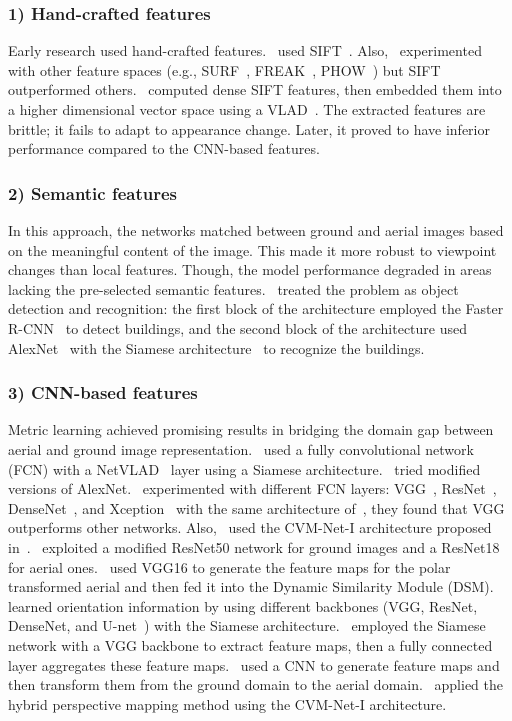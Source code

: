 \documentclass[10pt,letterpaper]{article}
\begin{document}
\subsubsection*{1) Hand-crafted features}
Early research used hand-crafted features.~\cite{bib20,bib26} used SIFT~\cite{bib27}. Also,~\cite{bib20} experimented with other feature spaces (e.g., SURF~\cite{bib28}, FREAK~\cite{bib29}, PHOW~\cite{bib30}) but SIFT outperformed others.~\cite{bib7} computed dense SIFT features, then embedded them into a higher dimensional vector space using a VLAD~\cite{bib31}. The extracted features are brittle; it fails to adapt to appearance change. Later, it proved to have inferior performance compared to the CNN-based features.
\subsubsection*{2) Semantic features}
In this approach, the networks matched between ground and aerial images based on the meaningful content of the image. This made it more robust to viewpoint changes than local features. Though, the model performance degraded in areas lacking the pre-selected semantic features.~\cite{bib32} treated the problem as object detection and recognition: the first block of the architecture employed the Faster R-CNN~\cite{bib33} to detect buildings, and the second block of the architecture used AlexNet~\cite{bib34} with the Siamese architecture~\cite{bib35} to recognize the buildings.
\subsubsection*{3) CNN-based features}
Metric learning achieved promising results in bridging the domain gap between aerial and ground image representation.~\cite{bib36} used a fully convolutional network (FCN) with a NetVLAD~\cite{bib34} layer using a Siamese architecture.~\cite{bib37} tried modified versions of AlexNet.~\cite{bib21} experimented with different FCN layers: VGG~\cite{bib31}, ResNet~\cite{bib38}, DenseNet~\cite{bib39}, and Xception~\cite{bib40} with the same architecture of~\cite{bib36}, they found that VGG outperforms other networks. Also,~\cite{bib22} used the CVM-Net-I architecture proposed in~\cite{bib36}.~\cite{bib41} exploited a modified ResNet50 network for ground images and a ResNet18 for aerial ones.~\cite{bib13} used VGG16 to generate the feature maps for the polar transformed aerial and then fed it into the Dynamic Similarity Module (DSM).~\cite{bib4} learned orientation information by using different backbones (VGG, ResNet, DenseNet, and U-net~\cite{bib42}) with the Siamese architecture.~\cite{bib43} employed  the Siamese network with a VGG backbone to extract feature maps, then a fully connected layer aggregates these feature maps.~\cite{bib44} used a CNN to generate feature maps and then transform them from the ground domain to the aerial domain.~\cite{bib14} applied the hybrid perspective mapping method using the CVM-Net-I architecture.
\end{document}
